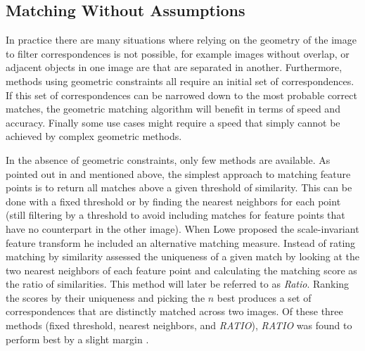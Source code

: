\subsection{Matching Without Assumptions}

In practice there are many situations where relying on the geometry of 
the image to filter correspondences is not possible, for example images 
without overlap, or adjacent objects in one image are that are separated 
in another. Furthermore, methods using geometric constraints all require 
an initial set of correspondences. If this set of correspondences can be 
narrowed down to the most probable correct matches, the geometric 
matching algorithm will benefit in terms of speed and accuracy.  Finally 
some use cases might require a speed that simply cannot be achieved by 
complex geometric methods.

In the absence of geometric constraints, only few methods are available.  
As pointed out in \cite{szeliski2010} and mentioned above, the simplest 
approach to matching feature points is to return all matches above a 
given threshold of similarity.  This can be done with a fixed threshold 
or by finding the nearest neighbors for each point (still filtering by a 
threshold to avoid including matches for feature points that have no 
counterpart in the other image).  When Lowe \cite{lowe2004sift} proposed 
the scale-invariant feature transform he included an alternative 
matching measure. Instead of rating matching by similarity assessed the 
uniqueness of a given match by looking at the two nearest neighbors of 
each feature point and calculating the matching score as the ratio of 
similarities. This method will later be referred to as \emph{Ratio}.  
Ranking the scores by their uniqueness and picking the $n$ best produces 
a set of correspondences that are distinctly matched across two images.  
Of these three methods (fixed threshold, nearest neighbors, and 
\emph{RATIO}), \emph{RATIO} was found to perform best by a slight margin 
\cite{mikolajczyk2005performance}.

